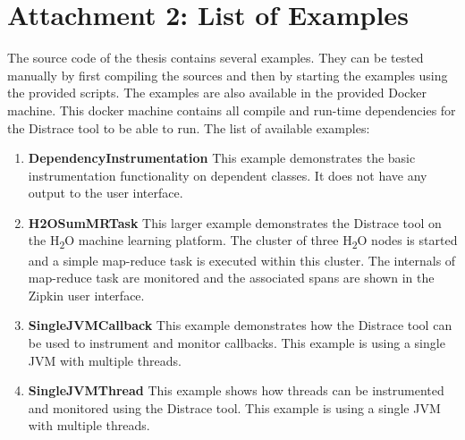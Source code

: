 \chapter*{Attachment 2: List of Examples}
The source code of the thesis contains several examples. They can be tested manually by first compiling the sources and then by starting the examples using the provided scripts. The examples are also available in the provided Docker machine. This docker machine contains all compile and run-time dependencies for the Distrace tool to be able to run. The list of available examples:
\begin{enumerate}
	\item \textbf{DependencyInstrumentation} \newline
	This example demonstrates the basic instrumentation functionality on dependent classes. It does not have any output to the user interface.
	\item \textbf{H2OSumMRTask} \newline
	This larger example demonstrates the Distrace tool on the H\textsubscript{2}O machine learning platform. The cluster of three H\textsubscript{2}O nodes is started and a simple map-reduce task is executed within this cluster. The internals of map-reduce task are monitored and the associated spans are shown in the Zipkin user interface.
	\item \textbf{SingleJVMCallback} \newline
	This example demonstrates how the Distrace tool can be used to instrument and monitor callbacks. This example is using a single JVM with multiple threads.
	\item \textbf{SingleJVMThread} \newline
	This example shows how threads can be instrumented and monitored using the Distrace tool. This example is using a single JVM with multiple threads.
\end{enumerate}
